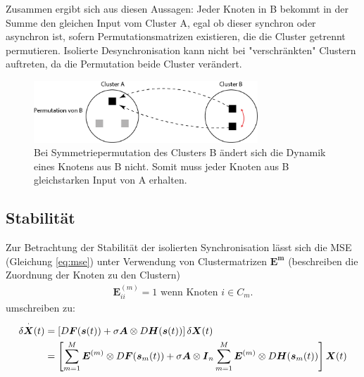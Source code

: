 Zusammen ergibt sich aus diesen Aussagen: Jeder Knoten in B bekommt in der Summe den gleichen Input vom Cluster A, egal ob dieser synchron oder asynchron ist, sofern Permutationsmatrizen existieren, die die Cluster getrennt permutieren. Isolierte Desynchronisation kann nicht bei "verschränkten" Clustern auftreten, da die Permutation beide Cluster verändert.

	\begin{figure}
		\includegraphics[width=0.75\textwidth]{abb/misc/perm_b.png}
		\caption{Bei Symmetriepermutation des Clusters B ändert sich die Dynamik eines Knotens aus B nicht. Somit muss jeder Knoten aus B gleichstarken Input von A erhalten.}
		\label{fig:permb}
	\end{figure}
	

\subsection*{Stabilität}
\label{stabilitaet}
Zur Betrachtung der Stabilität der isolierten Synchronisation lässt sich die MSE (Gleichung \ref{eq:mse})  unter Verwendung von Clustermatrizen $\boldsymbol{E^m}$ (beschreiben die Zuordnung der Knoten zu den Clustern)
\begin{align}
 \boldsymbol{E}^{(m)}_{ii} =1\text{ wenn Knoten }i \in C_m.
\end{align}
 umschreiben zu\cite{pecora2014}:
\begin{align}
	\label{eq:clustermse}
\notag	\delta\overset{\cdot}{\boldsymbol{X}}(t)&=	
	\left[D\boldsymbol{F}(\boldsymbol{s}(t))+\sigma\boldsymbol{A}\otimes D\boldsymbol{H}(\boldsymbol{s}(t))\right]\delta\boldsymbol{X}(t)\\&=
	\left[\sum_{m=1}^{M} \boldsymbol{E}^{(m)} \otimes D\boldsymbol{F}(\boldsymbol{s}_m(t))+\sigma\boldsymbol{A}\otimes \boldsymbol{I}_n\sum_{m=1}^{M} 			\boldsymbol{E}^{(m)}\otimes D\boldsymbol{H}(\boldsymbol{s}_m(t))\right]\boldsymbol{X}(t)
	\end{align}
	
